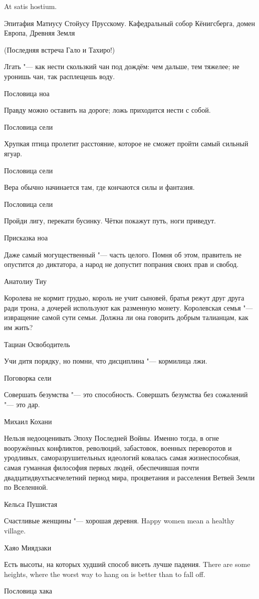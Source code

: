 \epigraph
{At satis hostium\footnotemark.}
{Эпитафия Матиусу Стойусу Прусскому.
Кафедральный собор Кёнигсберга, домен Европа, Древняя Земля}

(Последняя встреча Гало и Тахиро!)

\epigraph
{Лгать "--- как нести скользкий чан под дождём: чем дальше, тем тяжелее;
не уронишь чан, так расплещешь воду.}
{Пословица ноа}

\epigraph
{Правду можно оставить на дороге;
ложь приходится нести с собой.}
{Пословица сели}

\epigraph
{Хрупкая птица пролетит расстояние, которое не сможет пройти самый сильный ягуар.}
{Пословица сели}

\epigraph
{Вера обычно начинается там, где кончаются силы и фантазия.}
{Пословица сели}

\epigraph
{Пройди лигу\footnotemark, перекати бусинку.
Чётки покажут путь, ноги приведут.}
{Присказка ноа}

\epigraph
{Даже самый могущественный "--- часть целого.
Помня об этом, правитель не опустится до диктатора, а народ не допустит попрания своих прав и свобод.}
{Анатолиу Тиу}

\epigraph
{Королева не кормит грудью, король не учит сыновей, братья режут друг друга ради трона, а дочерей используют как разменную монету.
Королевская семья "--- извращение самой сути семьи.
Должна ли она говорить добрым талианцам, как им жить?}
{Тациан Освободитель}

\epigraph
{Учи дитя порядку, но помни, что дисциплина "--- кормилица лжи.}
{Поговорка сели}

\epigraph
{Совершать безумства "--- это способность.
Совершать безумства без сожалений "--- это дар.}
{Михаил Кохани}

\epigraph
{Нельзя недооценивать Эпоху Последней Войны.
Именно тогда, в огне вооружённых конфликтов, революций, забастовок, военных переворотов и уродливых, саморазрушительных идеологий ковалась самая жизнеспособная, самая гуманная философия первых людей, обеспечившая почти двадцатидвухтысячелетний период мира, процветания и расселения Ветвей Земли по Вселенной.}
{Кельса Пушистая}

\epigraph{
{Счастливые женщины "--- хорошая деревня.}
{Happy women mean a healthy village.}
}{Хаяо Миядзаки}

\epigraph{
{Есть высоты, на которых худший способ висеть лучше падения.}
{There are some heights, where the worst way to hang on is better than to fall off.}
}{Пословица хака}

